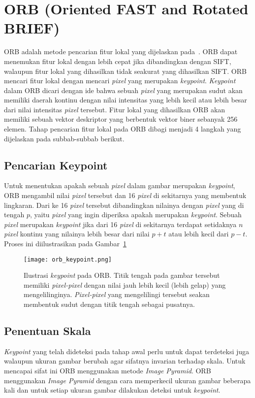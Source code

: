 \section{ORB (Oriented FAST and Rotated BRIEF)}
\label{sec:orb}
ORB adalah metode pencarian fitur lokal yang dijelaskan pada~\cite{rublee2011orb}. ORB dapat menemukan fitur lokal dengan lebih cepat jika dibandingkan dengan SIFT, walaupun fitur lokal yang dihasilkan tidak seakurat yang dihasilkan SIFT. ORB mencari fitur lokal dengan mencari \textit{pixel} yang merupakan \textit{keypoint}. \textit{Keypoint} dalam ORB dicari dengan ide bahwa sebuah \textit{pixel} yang merupakan sudut akan memiliki daerah kontinu dengan nilai intensitas yang lebih kecil atau lebih besar dari nilai intensitas \textit{pixel} tersebut. Fitur lokal yang dihasilkan ORB akan memiliki sebuah vektor deskriptor yang berbentuk vektor biner sebanyak 256 elemen. Tahap pencarian fitur lokal pada ORB dibagi menjadi 4 langkah yang dijelaskan pada subbab-subbab berikut.

\subsection{Pencarian Keypoint}
Untuk menentukan apakah sebuah \textit{pixel} dalam gambar merupakan \textit{keypoint}, ORB mengambil nilai \textit{pixel} tersebut dan 16 \textit{pixel} di sekitarnya yang membentuk lingkaran. Dari ke 16 \textit{pixel} tersebut dibandingkan nilainya dengan \textit{pixel} yang di tengah $p$, yaitu \textit{pixel} yang ingin diperiksa apakah merupakan \textit{keypoint}. Sebuah \textit{pixel} merupakan \textit{keypoint} jika dari 16 \textit{pixel} di sekitarnya terdapat setidaknya $n$ \textit{pixel} kontinu yang nilainya lebih besar dari nilai $p + t$ atau lebih kecil dari $p - t$. Proses ini diilustrasikan pada Gambar~\ref{fig:orb_keypoint}

\begin{figure}[H]
	\centering
	\texttt{[image: orb\_keypoint.png]}
	\caption{Ilustrasi \textit{keypoint} pada ORB. Titik tengah pada gambar tersebut memiliki \textit{pixel-pixel} dengan nilai jauh lebih kecil (lebih gelap) yang mengelilinginya. \textit{Pixel-pixel} yang mengelilingi tersebut seakan membentuk sudut dengan titik tengah sebagai pusatnya.}
	\label{fig:orb_keypoint}	
\end{figure}

\subsection{Penentuan Skala}
\textit{Keypoint} yang telah dideteksi pada tahap awal perlu untuk dapat terdeteksi juga walaupun ukuran gambar berubah agar sifatnya invarian terhadap skala. Untuk mencapai sifat ini ORB menggunakan metode \textit{Image Pyramid}. ORB menggunakan \textit{Image Pyramid} dengan cara memperkecil ukuran gambar beberapa kali dan untuk setiap ukuran gambar dilakukan deteksi untuk \textit{keypoint}. 

